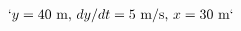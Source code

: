 \documentclass[preview]{standalone}
\begin{document}
\begin{align*}
`y = 40 \text{ m, } dy/dt = 5 \text{ m/s, } x = 30 \text{ m}`
\end{align*}
\end{document}
